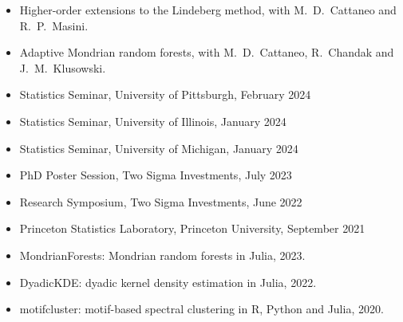 \documentclass{wgu-cv}
\begin{document}
\pagebreak

\begin{itemize}

  \item Higher-order extensions to the Lindeberg method,
    with M.\ D.\ Cattaneo and R.\ P.\ Masini.

  \item Adaptive Mondrian random forests,
    with M.\ D.\ Cattaneo, R.\ Chandak and J.\ M.\ Klusowski.
\end{itemize}

\begin{itemize}

  \item Statistics Seminar, University of Pittsburgh, February 2024
  \item Statistics Seminar, University of Illinois, January 2024
  \item Statistics Seminar, University of Michigan, January 2024
  \item PhD Poster Session, Two Sigma Investments, July 2023
  \item Research Symposium, Two Sigma Investments, June 2022
  \item Princeton Statistics Laboratory, Princeton University, September 2021
\end{itemize}

\begin{itemize}

  \item MondrianForests: Mondrian random forests in Julia, 2023. \\

  \item DyadicKDE: dyadic kernel density estimation in Julia, 2022. \\

  \item motifcluster: motif-based spectral clustering
    in R, Python and Julia, 2020. \\

\end{itemize}

\vspace*{2mm}

\vspace*{-6mm}
\end{document}
